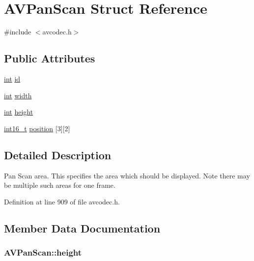 \hypertarget{struct_a_v_pan_scan}{}\section{A\+V\+Pan\+Scan Struct Reference}
\label{struct_a_v_pan_scan}


{\ttfamily \#include $<$avcodec.\+h$>$}

\subsection*{Public Attributes}
\begin{DoxyCompactItemize}
\item 
\hyperlink{xmltok_8h_a5a0d4a5641ce434f1d23533f2b2e6653}{int} \hyperlink{struct_a_v_pan_scan_a34dfbcbb6c9582d0a10d9592a3d2eed2}{id}
\item 
\hyperlink{xmltok_8h_a5a0d4a5641ce434f1d23533f2b2e6653}{int} \hyperlink{struct_a_v_pan_scan_a3963c714ee5ab0209f74de43bb2ef97b}{width}
\item 
\hyperlink{xmltok_8h_a5a0d4a5641ce434f1d23533f2b2e6653}{int} \hyperlink{struct_a_v_pan_scan_a76e1fcfbecaf034b5c4d6604d602e474}{height}
\item 
\hyperlink{lib-src_2ffmpeg_2win32_2stdint_8h_a044293bfeff56852a28ed6c2cfbb2649}{int16\+\_\+t} \hyperlink{struct_a_v_pan_scan_abfbf6d829276b4a73b97995827832eba}{position} \mbox{[}3\mbox{]}\mbox{[}2\mbox{]}
\end{DoxyCompactItemize}


\subsection{Detailed Description}
Pan Scan area. This specifies the area which should be displayed. Note there may be multiple such areas for one frame. 

Definition at line 909 of file avcodec.\+h.



\subsection{Member Data Documentation}
\subsubsection[{\texorpdfstring{height}{height}}]{ A\+V\+Pan\+Scan\+::height}\hypertarget{struct_a_v_pan_scan_a76e1fcfbecaf034b5c4d6604d602e474}{}\label{struct_a_v_pan_scan_a76e1fcfbecaf034b5c4d6604d602e474}


